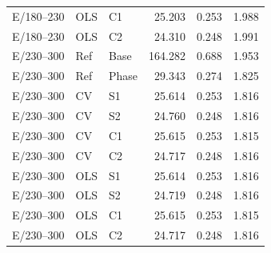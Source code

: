 \documentclass[11pt,a4paper]{article}
\begin{document}
\begin{longtable}{lllr rr}
E/180--230 & OLS & C1 & 25.203 & 0.253 & 1.988\\
E/180--230 & OLS & C2 & 24.310 & 0.248 & 1.991\\
E/230--300 & Ref & Base & 164.282 & 0.688 & 1.953\\
E/230--300 & Ref & Phase & 29.343 & 0.274 & 1.825\\
E/230--300 & CV & S1 & 25.614 & 0.253 & 1.816\\
E/230--300 & CV & S2 & 24.760 & 0.248 & 1.816\\
E/230--300 & CV & C1 & 25.615 & 0.253 & 1.815\\
E/230--300 & CV & C2 & 24.717 & 0.248 & 1.816\\
E/230--300 & OLS & S1 & 25.614 & 0.253 & 1.816\\
E/230--300 & OLS & S2 & 24.719 & 0.248 & 1.816\\
E/230--300 & OLS & C1 & 25.615 & 0.253 & 1.815\\
E/230--300 & OLS & C2 & 24.717 & 0.248 & 1.816\\
\bottomrule\end{longtable}\normalsize
\end{document}
